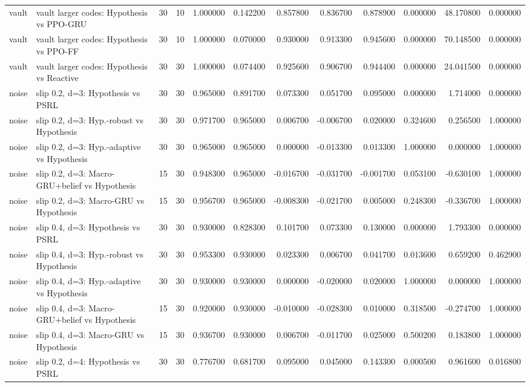 \begin{tabular}{llrrrrrrrrrr}
vault & vault larger codes: Hypothesis vs PPO-GRU & 30 & 10 & 1.000000 & 0.142200 & 0.857800 & 0.836700 & 0.878900 & 0.000000 & 48.170800 & 0.000000 \\
vault & vault larger codes: Hypothesis vs PPO-FF & 30 & 10 & 1.000000 & 0.070000 & 0.930000 & 0.913300 & 0.945600 & 0.000000 & 70.148500 & 0.000000 \\
vault & vault larger codes: Hypothesis vs Reactive & 30 & 30 & 1.000000 & 0.074400 & 0.925600 & 0.906700 & 0.944400 & 0.000000 & 24.041500 & 0.000000 \\
noise & slip 0.2, d=3: Hypothesis vs PSRL & 30 & 30 & 0.965000 & 0.891700 & 0.073300 & 0.051700 & 0.095000 & 0.000000 & 1.714000 & 0.000000 \\
noise & slip 0.2, d=3: Hyp.-robust vs Hypothesis & 30 & 30 & 0.971700 & 0.965000 & 0.006700 & -0.006700 & 0.020000 & 0.324600 & 0.256500 & 1.000000 \\
noise & slip 0.2, d=3: Hyp.-adaptive vs Hypothesis & 30 & 30 & 0.965000 & 0.965000 & 0.000000 & -0.013300 & 0.013300 & 1.000000 & 0.000000 & 1.000000 \\
noise & slip 0.2, d=3: Macro-GRU+belief vs Hypothesis & 15 & 30 & 0.948300 & 0.965000 & -0.016700 & -0.031700 & -0.001700 & 0.053100 & -0.630100 & 1.000000 \\
noise & slip 0.2, d=3: Macro-GRU vs Hypothesis & 15 & 30 & 0.956700 & 0.965000 & -0.008300 & -0.021700 & 0.005000 & 0.248300 & -0.336700 & 1.000000 \\
noise & slip 0.4, d=3: Hypothesis vs PSRL & 30 & 30 & 0.930000 & 0.828300 & 0.101700 & 0.073300 & 0.130000 & 0.000000 & 1.793300 & 0.000000 \\
noise & slip 0.4, d=3: Hyp.-robust vs Hypothesis & 30 & 30 & 0.953300 & 0.930000 & 0.023300 & 0.006700 & 0.041700 & 0.013600 & 0.659200 & 0.462900 \\
noise & slip 0.4, d=3: Hyp.-adaptive vs Hypothesis & 30 & 30 & 0.930000 & 0.930000 & 0.000000 & -0.020000 & 0.020000 & 1.000000 & 0.000000 & 1.000000 \\
noise & slip 0.4, d=3: Macro-GRU+belief vs Hypothesis & 15 & 30 & 0.920000 & 0.930000 & -0.010000 & -0.028300 & 0.010000 & 0.318500 & -0.274700 & 1.000000 \\
noise & slip 0.4, d=3: Macro-GRU vs Hypothesis & 15 & 30 & 0.936700 & 0.930000 & 0.006700 & -0.011700 & 0.025000 & 0.500200 & 0.183800 & 1.000000 \\
noise & slip 0.2, d=4: Hypothesis vs PSRL & 30 & 30 & 0.776700 & 0.681700 & 0.095000 & 0.045000 & 0.143300 & 0.000500 & 0.961600 & 0.016800 \\

\end{tabular}
